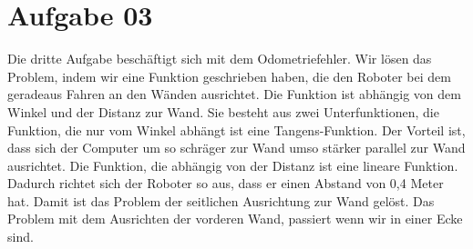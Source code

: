 \newpage
\section{Aufgabe 03}
Die dritte Aufgabe besch\"aftigt sich mit dem Odometriefehler.
Wir l\"osen das Problem, indem wir eine Funktion geschrieben haben,
die den Roboter bei dem geradeaus Fahren an den W\"anden ausrichtet.
Die Funktion ist abh\"angig von dem Winkel und der Distanz zur Wand.
Sie besteht aus zwei Unterfunktionen, die Funktion, die nur vom Winkel abh\"angt ist eine Tangens-Funktion.
Der Vorteil ist, dass sich der Computer um so schr\"ager zur Wand umso st\"arker parallel zur Wand ausrichtet.
Die Funktion, die abh\"angig von der Distanz ist eine lineare Funktion.
Dadurch richtet sich der Roboter so aus, dass er einen Abstand von 0,4 Meter hat.
Damit ist das Problem der seitlichen Ausrichtung zur Wand gel\"ost.
Das Problem mit dem Ausrichten der vorderen Wand, passiert wenn wir in einer Ecke sind.
